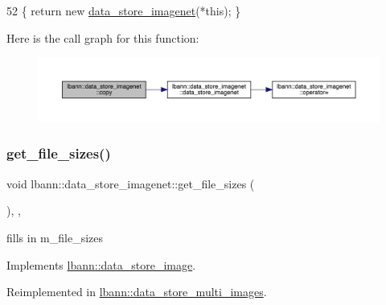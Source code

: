 \begin{DoxyCode}
52 \{ \textcolor{keywordflow}{return} \textcolor{keyword}{new} \hyperlink{classlbann_1_1data__store__imagenet_a3040285850664ccecb4795df3c85fb8d}{data\_store\_imagenet}(*\textcolor{keyword}{this}); \}
\end{DoxyCode}
Here is the call graph for this function\+:\nopagebreak
\begin{figure}[H]
\begin{center}
\leavevmode
\includegraphics[width=350pt]{classlbann_1_1data__store__imagenet_ae3b0d31ac020c36f41766999288e2d25_cgraph}
\end{center}
\end{figure}
\mbox{\label{classlbann_1_1data__store__imagenet_ae8f5d8741ddd762ffd3a477504bca619}} 
\subsubsection{\texorpdfstring{get\+\_\+file\+\_\+sizes()}{get\_file\_sizes()}}
{\footnotesize\ttfamily void lbann\+::data\+\_\+store\+\_\+imagenet\+::get\+\_\+file\+\_\+sizes (\begin{DoxyParamCaption}{ }\end{DoxyParamCaption})\hspace{0.3cm}{\ttfamily [override]}, {\ttfamily [protected]}, {\ttfamily [virtual]}}



fills in m\+\_\+file\+\_\+sizes 



Implements \hyperlink{classlbann_1_1data__store__image_a8694bc9157c5fdc80bb5c251e68e18cb}{lbann\+::data\+\_\+store\+\_\+image}.



Reimplemented in \hyperlink{classlbann_1_1data__store__multi__images_a25963dfa7d6de983e7b250f8ef7e2a0e}{lbann\+::data\+\_\+store\+\_\+multi\+\_\+images}.



